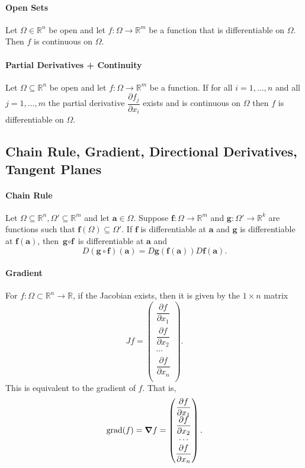 \paragraph{Open Sets}
Let \(\Omega\in\mathbb R^n\) be open and let \(f:\Omega \to \mathbb R^m\) be a
function that is differentiable on \(\Omega\). Then \(f\) is continuous on \(\Omega\).

\paragraph{Partial Derivatives + Continuity}
Let \(\Omega \subseteq \mathbb R^n\) be open and let \(f: \Omega \to \mathbb R^m\)
be a function. If for all \(i = 1, \dots, n\) and all \(j = 1,\dots, m\) the partial
derivative \(\dfrac{\partial f_j}{\partial x_i}\) exists and is continuous on \(\Omega\)
then \(f\) is differentiable on \(\Omega\).

\subsection{Chain Rule, Gradient, Directional Derivatives, Tangent Planes}
\paragraph{Chain Rule}
Let \(\Omega \subseteq \mathbb{R}^n, \Omega' \subseteq \mathbb{R}^m\) and let 
\(\textbf{a} \in \Omega\). Suppose \(\textbf{f}:\Omega \to \mathbb R^m\) and
\(\textbf{g}:\Omega'\to\mathbb R^k\) are functions such that 
\(\textbf{f}(\Omega)\subseteq\Omega'\). If \(\textbf{f}\) is differentiable at \(\textbf{a}\)
and \(\textbf{g}\) is differentiable at \(\textbf{f}(\textbf{a})\), then 
\(\textbf{g}\circ\textbf{f}\) is differentiable at \(\textbf{a}\) and 
\[
    D(\textbf{g}\circ\textbf{f})(\textbf{a})=
    D\textbf{g}(\textbf{f}(\textbf{a}))D\textbf{f}(\textbf{a}).
\]

\paragraph{Gradient}
For \(f: \Omega\subset \mathbb{R}^n\to \mathbb{R}\), if the Jacobian exists,
then it is given by the \(1\times n\) matrix
\[
    Jf = \begin{pmatrix}
        \dfrac{\partial f}{\partial x_1} \\
        \dfrac{\partial f}{\partial x_2} \\
        \cdots                           \\
        \dfrac{\partial f}{\partial x_n} \\
    \end{pmatrix}.
\]
This is equivalent to the gradient of \(f\). That is,
\[
    \text{grad}(f) = \grad f = 
    \begin{pmatrix}
        \dfrac{\partial f}{\partial x_1} \\
        \dfrac{\partial f}{\partial x_2} \\
        \cdots                           \\
        \dfrac{\partial f}{\partial x_n} \\
    \end{pmatrix}.
\]

